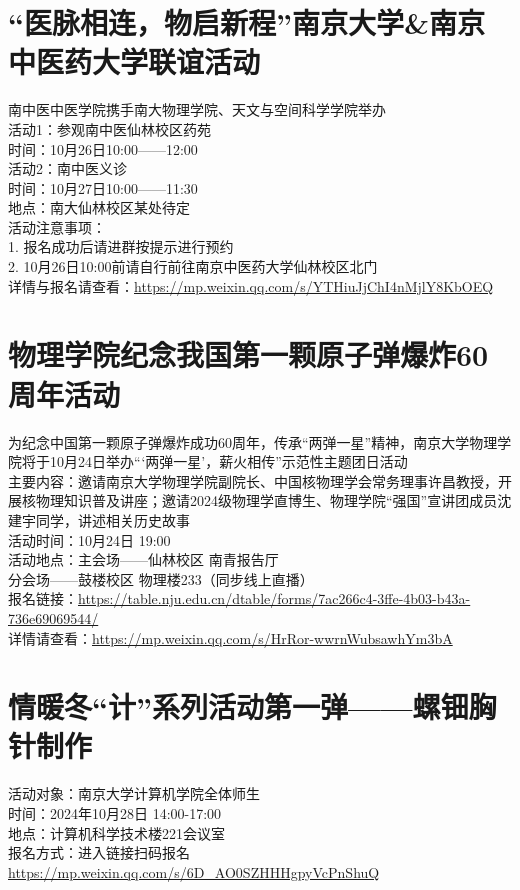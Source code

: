 \documentclass[letterpaper, 12pt]{article}
\begin{document}
\begin{multicols}{2}
{\section{“医脉相连，物启新程”南京大学&南京中医药大学联谊活动}
南中医中医学院携手南大物理学院、天文与空间科学学院举办\\
活动1：参观南中医仙林校区药苑\\
时间：10月26日10:00——12:00\\
活动2：南中医义诊\\
时间：10月27日10:00——11:30\\
地点：南大仙林校区某处待定\\
活动注意事项：\\
1. 报名成功后请进群按提示进行预约\\
2. 10月26日10:00前请自行前往南京中医药大学仙林校区北门\\
详情与报名请查看：\url{https://mp.weixin.qq.com/s/YTHiuJjChI4nMjlY8KbOEQ}\\
\section{物理学院纪念我国第一颗原子弹爆炸60周年活动}
为纪念中国第一颗原子弹爆炸成功60周年，传承“两弹一星”精神，南京大学物理学院将于10月24日举办“‘两弹一星’，薪火相传”示范性主题团日活动\\
主要内容：邀请南京大学物理学院副院长、中国核物理学会常务理事许昌教授，开展核物理知识普及讲座；邀请2024级物理学直博生、物理学院“强国”宣讲团成员沈建宇同学，讲述相关历史故事\\
活动时间：10月24日 19:00\\
活动地点：主会场——仙林校区 南青报告厅 \\
分会场——鼓楼校区 物理楼233（同步线上直播）\\
报名链接：\url{https://table.nju.edu.cn/dtable/forms/7ac266c4-3ffe-4b03-b43a-736e69069544/}\\
详情请查看：\url{https://mp.weixin.qq.com/s/HrRor-wwrnWubsawhYm3bA}\\
\section{情暖冬“计”系列活动第一弹——螺钿胸针制作}
活动对象：南京大学计算机学院全体师生\\
时间：2024年10月28日 14:00-17:00\\
地点：计算机科学技术楼221会议室\\
报名方式：进入链接扫码报名\url{https://mp.weixin.qq.com/s/6D_AO0SZHHHgpyVcPnShuQ}


}
\end{multicols}
\end{document}
